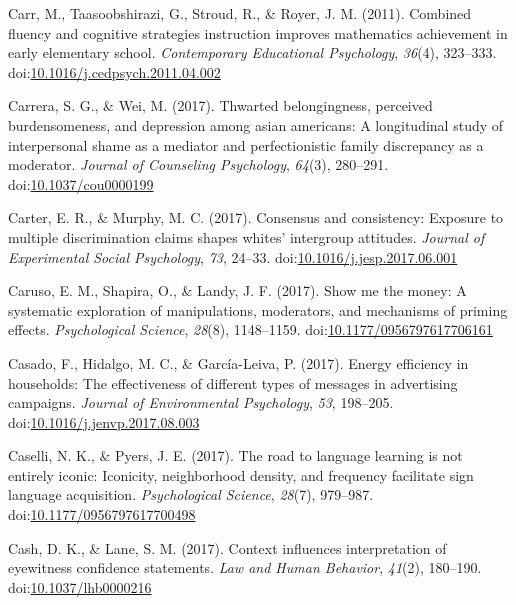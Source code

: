 \documentclass[english,man]{apa6}
\theoremstyle{definition}
\theoremstyle{definition}
\theoremstyle{definition}
\theoremstyle{remark}
\begin{document}
\hypertarget{ref-Carr2011}{}
Carr, M., Taasoobshirazi, G., Stroud, R., \& Royer, J. M. (2011).
Combined fluency and cognitive strategies instruction improves
mathematics achievement in early elementary school. \emph{Contemporary
Educational Psychology}, \emph{36}(4), 323--333.
doi:\href{https://doi.org/10.1016/j.cedpsych.2011.04.002}{10.1016/j.cedpsych.2011.04.002}

\hypertarget{ref-Carrera2017}{}
Carrera, S. G., \& Wei, M. (2017). Thwarted belongingness, perceived
burdensomeness, and depression among asian americans: A longitudinal
study of interpersonal shame as a mediator and perfectionistic family
discrepancy as a moderator. \emph{Journal of Counseling Psychology},
\emph{64}(3), 280--291.
doi:\href{https://doi.org/10.1037/cou0000199}{10.1037/cou0000199}

\hypertarget{ref-Carter2017}{}
Carter, E. R., \& Murphy, M. C. (2017). Consensus and consistency:
Exposure to multiple discrimination claims shapes whites' intergroup
attitudes. \emph{Journal of Experimental Social Psychology}, \emph{73},
24--33.
doi:\href{https://doi.org/10.1016/j.jesp.2017.06.001}{10.1016/j.jesp.2017.06.001}

\hypertarget{ref-Caruso2017}{}
Caruso, E. M., Shapira, O., \& Landy, J. F. (2017). Show me the money: A
systematic exploration of manipulations, moderators, and mechanisms of
priming effects. \emph{Psychological Science}, \emph{28}(8), 1148--1159.
doi:\href{https://doi.org/10.1177/0956797617706161}{10.1177/0956797617706161}

\hypertarget{ref-Casado2017}{}
Casado, F., Hidalgo, M. C., \& García-Leiva, P. (2017). Energy
efficiency in households: The effectiveness of different types of
messages in advertising campaigns. \emph{Journal of Environmental
Psychology}, \emph{53}, 198--205.
doi:\href{https://doi.org/10.1016/j.jenvp.2017.08.003}{10.1016/j.jenvp.2017.08.003}

\hypertarget{ref-Caselli2017}{}
Caselli, N. K., \& Pyers, J. E. (2017). The road to language learning is
not entirely iconic: Iconicity, neighborhood density, and frequency
facilitate sign language acquisition. \emph{Psychological Science},
\emph{28}(7), 979--987.
doi:\href{https://doi.org/10.1177/0956797617700498}{10.1177/0956797617700498}

\hypertarget{ref-Cash2017}{}
Cash, D. K., \& Lane, S. M. (2017). Context influences interpretation of
eyewitness confidence statements. \emph{Law and Human Behavior},
\emph{41}(2), 180--190.
doi:\href{https://doi.org/10.1037/lhb0000216}{10.1037/lhb0000216}
\end{document}
